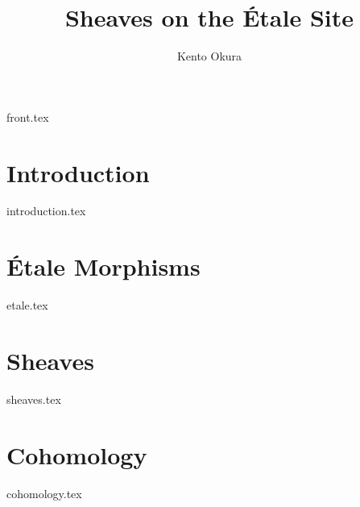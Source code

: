 \documentclass[11pt, openany]{memoir}
\title{Sheaves on the \'Etale Site}
\author{Kento Okura}
\begin{document}
\frontmatter
{front.tex}

\mainmatter

\chapter{Introduction}
{introduction.tex}

\chapter{\'Etale Morphisms}
{etale.tex}

\chapter{Sheaves}
{sheaves.tex}

\chapter{Cohomology}
{cohomology.tex}



\end{document}
